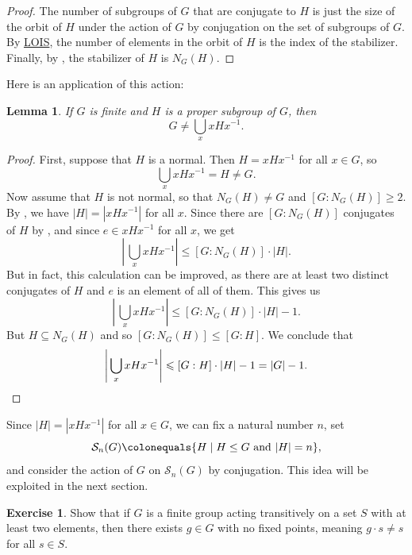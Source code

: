 \documentclass[12pt]{report}
\newtheorem{lemma}[theorem]{Lemma}
\numberwithin{equation}{section}
\numberwithin{theorem}{chapter}
\theoremstyle{definition}
\newtheorem{exercise}{Exercise}
\newtheorem*{basic properties}{Basic Properties}
\newtheorem*{Important Remark}{Important Remark}
\begin{document}
\begin{proof}
The number of subgroups of $G$ that are conjugate to $H$ is just the size of the orbit of $H$ under the action of $G$ by conjugation on the set of subgroups of $G$. 
	By \hyperref[lois]{LOIS}, the number of elements in the orbit of $H$ is the index of the stabilizer. Finally, by , the stabilizer of $H$ is $N_G(H)$.
\end{proof}




Here is an application of this action:

\begin{lemma} 
If $G$ is finite and $H$ is a proper subgroup of $G$, then 
$$G \neq \bigcup_x xHx^{-1}.$$
\end{lemma}


\begin{proof}
First, suppose that $H$ is a normal. Then $H = xHx^{-1}$ for all $x \in G$, so
$$\bigcup_x xHx^{-1} = H \neq G.$$
Now assume that $H$ is not normal, so that $N_G(H) \neq G$ and $[G: N_G(H)] \geqslant 2$. 
By , we have $|H| = |xHx^{-1}|$ for all $x$. Since there are $[G: N_G(H)]$ conjugates of $H$ by , and since $e \in xHx^{-1}$ for all $x$, 
  we get
  $$\left| \, \bigcup_x xHx^{-1} \right| \leqslant [G:N_G(H)] \cdot |H|.$$
  But in fact, this calculation can be improved, as there are at least two distinct conjugates of $H$ and $e$ is an element of all of them. This gives us
  $$\left| \, \bigcup_x xHx^{-1} \right| \leqslant [G:N_G(H)] \cdot |H| - 1.$$
  But $H \subseteq N_G(H)$ and so $[G: N_G(H)] \leq [G:H]$. We conclude that
  $$\left| \, \bigcup_x xHx^{-1} \right| \leqslant [G:H] \cdot |H| - 1  = |G| - 1.\qedhere$$
\end{proof}



\vspace{2em}

Since $|H| = |xHx^{-1}|$ for all $x \in G$, we can fix a natural number $n$, set
$$\mathcal{S}_n(G) \colonequals \{H \mid H \leq G  \text{ and } |H| = n\},$$ 
and consider the action of $G$ on $\mathcal{S}_n(G)$ by conjugation.
This idea will be exploited in the next section. 



\begin{exercise}
	Show that if $G$ is a finite group acting transitively on a set $S$ with at least two elements, then there exists $g \in G$ with no fixed points, meaning $g \cdot s \neq s$ for all $s \in S$.
\end{exercise}
\end{document}
